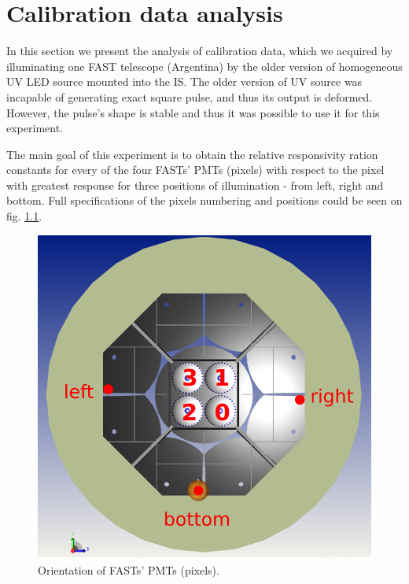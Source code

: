 
\chapter{Calibration data analysis}
In this section we present the analysis of calibration data, which we acquired by illuminating one FAST telescope (Argentina) by the older version of homogeneous UV LED source mounted into the IS. The older version of UV source was incapable of generating exact square pulse, and thus its output is deformed. However, the pulse's shape is stable and thus it was possible to use it for this experiment.   

\par
The main goal of this experiment is to obtain the relative responsivity ration constants for every of the four FASTs' PMTs (pixels) with respect to the pixel with greatest response for three positions of illumination - from left, right and bottom. Full specifications of the pixels numbering and positions could be seen on fig. \ref{PMT orientation}.

\begin{figure}[H]
 \centering
 \includegraphics[scale=0.35, angle = 0]{./pictures/orientation2.png}
 \caption{Orientation of FASTs' PMTs (pixels).}
 \label{PMT orientation}
 
\end{figure}

